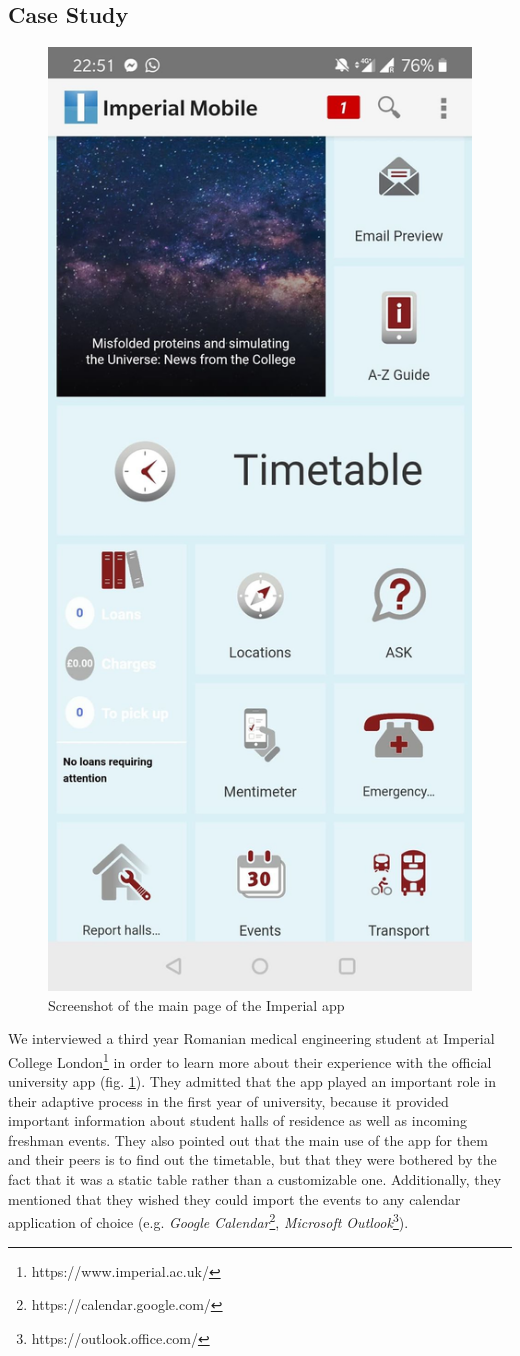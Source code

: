     \subsection{Case Study} \label{2:uni_apps_case_study}

        \begin{figure}
            \centering
            \includegraphics[width=0.23\columnwidth]{figures/uni_apps/screenshots/imperial.jpg}
            \captionsetup{labelsep=space, textformat=empty}
            \caption{Screenshot of the main page of the Imperial app}
            \label{2:fig:imperial_screenshot}
        \end{figure}
    
        We interviewed a third year Romanian medical engineering student at Imperial College London\footnote{https://www.imperial.ac.uk/} in order to learn more about their experience with the official university app (fig. \ref{2:fig:imperial_screenshot}). They admitted that the app played an important role in their adaptive process in the first year of university, because it provided important information about student halls of residence as well as incoming freshman events. They also pointed out that the main use of the app for them and their peers is to find out the timetable, but that they were bothered by the fact that it was a static table rather than a customizable one. Additionally, they mentioned that they wished they could import the events to any calendar application of choice (e.g. \textit{Google Calendar}\footnote{https://calendar.google.com/}, \textit{Microsoft Outlook}\footnote{https://outlook.office.com/}).
        
        \clearpage
        
